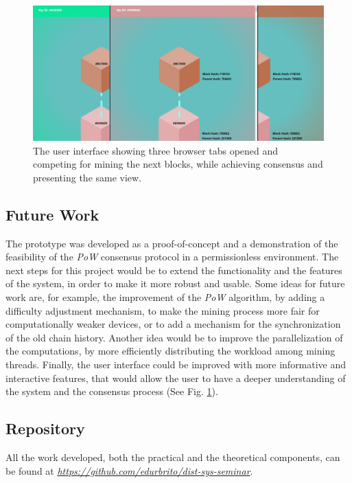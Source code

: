 \documentclass[journal]{IEEEtran}
\begin{document}
\begin{figure}[h]
  \centering
  \includegraphics[width=\columnwidth]{in-browser-pow}
  \caption{The user interface showing three browser tabs opened and competing for mining the next blocks, 
  while achieving consensus and presenting the same view.}
  \label{fig:in-browser-pow}
\end{figure}

\subsection{Future Work}

The prototype was developed as a proof-of-concept and a demonstration of the feasibility
of the \emph{PoW} consensus protocol in a permissionless environment. The next steps
for this project would be to extend the functionality and the features of the system,
in order to make it more robust and usable. Some ideas for future work are, for example,
the improvement of the \emph{PoW} algorithm, by adding a difficulty adjustment mechanism,
to make the mining process more fair for computationally weaker devices, or to
add a mechanism for the synchronization of the old chain history. Another idea would be to
improve the parallelization of the computations, by more efficiently distributing the
workload among mining threads. Finally, the user interface could be improved 
with more informative and interactive features, that would allow the user to have a 
deeper understanding of the system and the consensus process (See Fig. \ref{fig:in-browser-pow}).

\subsection{Repository}

All the work developed, both the practical and the theoretical components, can be found 
at \emph{\url{https://github.com/edurbrito/dist-sys-seminar}}.

\end{document}
